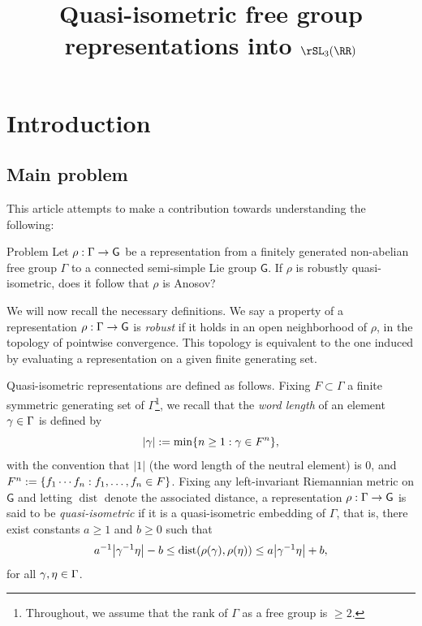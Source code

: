 \documentclass[AHL,Unicode,longabstracts]{cedram}
\title[Quasi-isometric free groups in $\rSL_3(\RR)$]{Quasi-isometric free group representations into $\rSL_3(\RR)$}
\author[\initial{L.} \lastname{Carvajales}]{\firstname{León} \lastname{Carvajales}}
\author[\initial{P.} \lastname{Lessa}]{\firstname{Pablo} \lastname{Lessa}}
\author[\initial{R.} \lastname{Potrie}]{\firstname{Rafael} \lastname{Potrie}}
\DeclareMathOperator{\dist}{dist}
\newcommand{\sG}{\mathsf{G}}
\renewcommand*{\to}{\mathchoice{\longrightarrow}{\rightarrow}{\rightarrow}{\rightarrow}}
\let\originalleft\left
\let\originalright\right
\renewcommand{\left}{\mathopen{}\mathclose\bgroup\originalleft}
\renewcommand{\right}{\aftergroup\egroup\originalright}
\let\oldin\in
\renewcommand{\in}{\mathchoice{\oldin}{\oldin}{\,\oldin\,}{\,\oldin\,}}
\begin{document}
\maketitle

\section{Introduction}

\subsection{Main problem}

This article attempts to make a contribution towards understanding the following:

\begin{enonce}{Problem}\label{prob1}
Let $\rho:\Gamma \to \sG$ be a representation from a finitely generated non-abelian free group $\Gamma$ to a connected semi-simple Lie group $\sG$. If $\rho$ is robustly quasi-isometric, does it follow that $\rho$ is Anosov?
\end{enonce}

We will now recall the necessary definitions. We say a property of a representation $\rho:\Gamma \to \sG$ is \emph{robust} if it holds in an open neighborhood of $\rho$, in the topology of pointwise convergence. This topology is equivalent to the one induced by evaluating a representation on a given finite generating set.

Quasi-isometric representations are defined as follows. Fixing $F \subset \Gamma$ a finite symmetric generating set of $\Gamma$\footnote{Throughout, we assume that the rank of $\Gamma$ as a free group is $\geq 2$.}, we recall that the \emph{word length} of an element $\gamma \in \Gamma$ is defined by
\[
|\gamma| := \min\{ n \ge 1: \gamma \in F^n\},
\]
with the convention that $|1|$ (the word length of the neutral element) is $0$, and $F^n := \{ f_1\cdots f_n: f_1,\ldots,f_n \in F\}$. Fixing any left-invariant Riemannian metric on $\sG$ and letting $\dist$ denote the associated distance, a representation $\rho:\Gamma \to \sG$ is said to be \emph{quasi-isometric} if it is a quasi-isometric embedding of $\Gamma$, that is, there exist constants $a \ge 1$ and $b \ge 0$ such that
\begin{equation}\label{eq: QI}
a^{-1}\left|\gamma^{-1}\eta\right| - b\le \dist(\rho(\gamma),\rho(\eta)) \le a\left|\gamma^{-1}\eta\right| + b,
\end{equation}
for all $\gamma,\eta \in \Gamma$.
\end{document}
